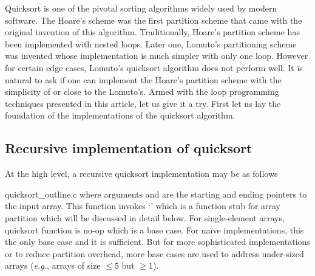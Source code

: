 Quicksort is one of the pivotal sorting algorithms widely used by modern software.
The Hoare's scheme was the first partition scheme that came
with the original invention of this algorithm\cite{Hoare1961,Hoare1962,sedgewick:1978}.
Traditionally, Hoare's partition scheme has been implemented with nested loops.
Later one, Lomuto's partitioning scheme was invented whose implementation is much simpler with only
one loop\cite{Bentley:1986:PP}.
However for certain edge cases, Lomuto's quicksort algorithm does not perform well.
It is natural to ask if one can implement the Hoare's partition scheme with the simplicity of or
close to the Lomuto's.
Armed with the loop programming techniques presented in this article, let us give it a try.
First let us lay the foundation of the implementations of the quicksort algorithm.


\subsection{Recursive implementation of quicksort}\label{subsec:recursive-impl-quicksort}
At the high level, a recursive quicksort implementation may be as follows

{quicksort_outline.c}
where arguments  and  are the starting and ending pointers to the input array.
This function invokes `' which is a function stub for array
partition which will be discussed in detail below.
For single-element arrays, quicksort function is no-op which is a base case.
For na\"{i}ve implementations, this the only base case and it is sufficient.
But for more sophisticated implementations or to reduce partition overhead, more base
cases are used to address under-sized arrays (\textit{e.g.}, arrays of size $\leq 5$ but $\geq 1$).


